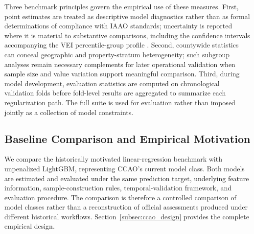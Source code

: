 \documentclass[10pt]{article}
\theoremstyle{definition}
\newcommand{\1}{\mathbf{1}}
\begin{document}

{Three benchmark principles govern the empirical use of these measures. First, point estimates are treated as descriptive model diagnostics rather than as formal determinations of compliance with IAAO standards; uncertainty is reported where it is material to substantive comparisons, including the confidence intervals accompanying the VEI percentile-group profile \cite{IAAO2013Ratio,IAAO2026ExposureRatio}. Second, countywide statistics can conceal geographic and property-stratum heterogeneity; such subgroup analyses remain necessary complements for later operational validation when sample size and value variation support meaningful comparison. Third, during model development, evaluation statistics are computed on chronological validation folds before fold-level results are aggregated to summarize each regularization path. The full suite is used for evaluation rather than imposed jointly as a collection of model constraints.}





\subsection{Baseline Comparison and Empirical Motivation}
\label{subsec:baseline_tension}

{We compare the historically motivated linear-regression benchmark with unpenalized LightGBM, representing CCAO's current model class.} Both models are estimated and evaluated under the same prediction target,
underlying feature information, sample-construction rules, temporal-validation
framework, and evaluation procedure. The comparison is therefore a controlled
comparison of model classes rather than a reconstruction of official
assessments produced under different historical workflows.
Section~\ref{subsec:ccao_design} provides the complete empirical design.
\end{document}
